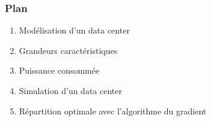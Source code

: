 \documentclass[a4paper,11pt]{beamer}
\newcommand{\eff}{_\text{eff}}
\begin{document}
\begin{frame}
    \frametitle{Plan}
    \begin{enumerate}
        \item Modélisation d'un data center
        \item Grandeurs caractéristiques
        \item Puissance consommée
        \item Simulation d'un data center
        \item Répartition optimale avec l'algorithme du gradient
    \end{enumerate}
\end{frame}

%
%
%
%
%
%
%
%
%
%
\end{document}

